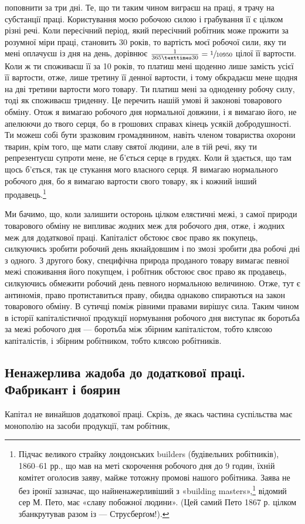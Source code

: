 \parcont{}  %
поповнити за три дні. Те, що ти таким чином виграєш на праці,
я трачу на субстанції праці. Користування моєю робочою силою
і грабування її є цілком різні речі. Коли пересічний період,
який пересічний робітник може прожити за розумної міри праці,
становить 30 років, то вартість моєї робочої сили, яку ти мені
оплачуєш із дня на день, дорівнює $\frac{1}{365×30} = \sfrac{1}{10950}$ цілої її
вартости. Коли ж ти споживаєш її за 10 років, то платиш мені
щоденно лише  замість  усієї її вартости, отже, лише
третину її денної вартости, і тому обкрадаєш мене щодня на дві
третини вартости мого товару. Ти платиш мені за одноденну
робочу силу, тоді як споживаєш триденну. Це перечить нашій
умові й законові товарового обміну. Отож я вимагаю робочого
дня нормальної довжини, і я вимагаю його, не апелюючи до твого
серця, бо в грошових справах кінець усякій добродушності.
Ти можеш собі бути зразковим громадянином, навіть членом
товариства охорони тварин, крім того, ще мати славу святої
людини, але в тій речі, яку ти репрезентуєш супроти мене, не
б’ється серце в грудях. Коли й здається, що там щось б’ється,
так це стукання мого власного серця. Я вимагаю нормального
робочого дня, бо я вимагаю вартости свого товару, як і кожний
інший продавець.\footnote{
Підчас великого страйку лондонських builders (будівельних робітників),
1860--61 рр., що мав на меті скорочення робочого дня до 9 годин,
їхній комітет оголосив заяву, майже тотожну промові нашого робітника.
Заява не без іронії зазначає, що найненажерливіший з «building
masters»,\footnote*{— будівельних підприємців. \emph{Ред.}
} відомий сер М. Пето, має «славу побожної людини». (Цей
самий Пето 1867 р. цілком збанкрутував разом із — Струсберґом!).
}

Ми бачимо, що, коли залишити осторонь цілком елястичні
межі, з самої природи товарового обміну не випливає жодних
меж для робочого дня, отже, і жодних меж для додаткової праці.
Капіталіст обстоює своє право як покупець, силкуючись зробити
робочий день якнайдовшим і по змозі зробити два робочі дні з
одного. З другого боку, специфічна природа проданого товару
вимагає певної межі споживання його покупцем, і робітник обстоює
своє право як продавець, силкуючись обмежити робочий день
певного нормальною величиною. Отже, тут є антиномія, право
протиставиться праву, обидва однаково спираються на закон
товарового обміну. В сутичці поміж рівними правами вирішує
сила. Таким чином в історії капіталістичної продукції нормування
робочого дня виступає як боротьба за межі робочого дня —
боротьба між збірним капіталістом, тобто клясою капіталістів,
і збірним робітником, тобто клясою робітників.

\subsection{ Ненажерлива жадоба до додаткової праці. Фабрикант і боярин}

Капітал не винайшов додаткової праці. Скрізь, де якась частина
суспільства має монополію на засоби продукції, там робітник,
\parbreak{}  %
